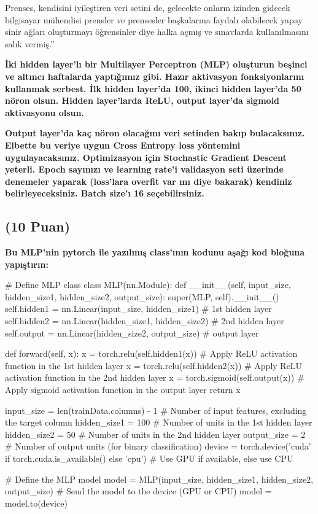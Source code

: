 \documentclass[11pt]{article}
\begin{document}
Prenses, kendisini iyileştiren veri setini de, gelecekte onların izinden gidecek bilgisayar mühendisi prensler ve prensesler başkalarına faydalı olabilecek yapay sinir ağları oluşturmayı öğrensinler diye halka açmış ve sınavlarda kullanılmasını salık vermiş.''

\textbf{İki hidden layer'lı bir Multilayer Perceptron (MLP) oluşturun beşinci ve altıncı haftalarda yaptığımız gibi. Hazır aktivasyon fonksiyonlarını kullanmak serbest. İlk hidden layer'da 100, ikinci hidden layer'da 50 nöron olsun. Hidden layer'larda ReLU, output layer'da sigmoid aktivasyonu olsun.}

\textbf{Output layer'da kaç nöron olacağını veri setinden bakıp bulacaksınız. Elbette bu veriye uygun Cross Entropy loss yöntemini uygulayacaksınız. Optimizasyon için Stochastic Gradient Descent yeterli. Epoch sayınızı ve learning rate'i validasyon seti üzerinde denemeler yaparak (loss'lara overfit var mı diye bakarak) kendiniz belirleyeceksiniz. Batch size'ı 16 seçebilirsiniz.}

\subsection{(10 Puan)} \textbf{Bu MLP'nin pytorch ile yazılmış class'ının kodunu aşağı kod bloğuna yapıştırın:}

\begin{python}

# Define MLP class
class MLP(nn.Module):
    def __init__(self, input_size, hidden_size1, hidden_size2, output_size):
        super(MLP, self).__init__()
        self.hidden1 = nn.Linear(input_size, hidden_size1) # 1st hidden layer
        self.hidden2 = nn.Linear(hidden_size1, hidden_size2) # 2nd hidden layer
        self.output = nn.Linear(hidden_size2, output_size) # output layer

    def forward(self, x):
        x = torch.relu(self.hidden1(x)) # Apply ReLU activation function in the 1st hidden layer
        x = torch.relu(self.hidden2(x)) # Apply ReLU activation function in the 2nd hidden layer
        x = torch.sigmoid(self.output(x)) # Apply sigmoid activation function in the output layer
        return x
        
input_size = len(trainData.columns) - 1 # Number of input features, excluding the target column
hidden_size1 = 100 # Number of units in the 1st hidden layer
hidden_size2 = 50 # Number of units in the 2nd hidden layer
output_size = 2 # Number of output units (for binary classification)
device = torch.device('cuda' if torch.cuda.is_available() else 'cpu') # Use GPU if available, else use CPU

# Define the MLP model
model = MLP(input_size, hidden_size1, hidden_size2, output_size)
# Send the model to the device (GPU or CPU)
model = model.to(device)

\end{python}
\end{document}
